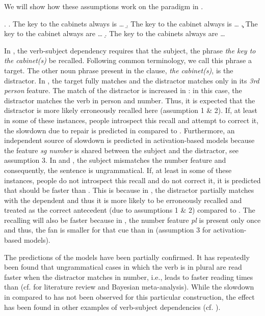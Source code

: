 \documentclass[11pt]{article} %
\begin{document}
\noindent We will show how these assumptions work on the paradigm in \Next.

\ex.
\a. The key to the cabinets always is \ldots
\b. The key to the cabinet always is \ldots
\c. The key to the cabinet always are \ldots
\d. The key to the cabinets always are \ldots

In \Last, the verb-subject dependency requires that the subject, the phrase \textit{the key to the cabinet(s)} be recalled. Following common terminology, we call this phrase a target. The other noun phrase present in the clause, \textit{the cabinet(s)}, is the distractor. In \Last[a], the target fully matches and the distractor matches only in its \emph{3rd person} feature. The match of the distractor is increased in \Last[b]: in this case, the distractor matches the verb in person and number. Thus, it is expected that the distractor is more likely erroneously recalled here (assumption 1 \& 2). If, at least in some of these instances, people introspect this recall and attempt to correct it, the slowdown due to repair is predicted in \Last[b] compared to \Last[a]. Furthermore, an independent source of slowdown is predicted in activation-based models because the feature \emph{sg number} is shared between the subject and the distractor, see assumption 3. In \Last[c] and \Last[d], the subject mismatches the number feature and consequently, the sentence is ungrammatical. If, at least in some of these instances, people do not introspect this recall and do not correct it, it is predicted that \Last[d] should be faster than \Last[c]. This is because in \Last[d], the distractor partially matches with the dependent and thus it is more likely to be erroneously recalled and treated as the correct antecedent (due to assumptions 1 \& 2) compared to \Last[c]. The recalling will also be faster because in \Last[d], the number feature \textit{pl} is present only once and thus, the fan is smaller for that cue than in \Last[c] (assumption 3 for activation-based models).

The predictions of the models have been partially confirmed. It has repeatedly been found that ungrammatical cases in which the verb is in plural are read faster when the distractor matches in number, i.e., \Last[d] leads to faster reading times than \Last[c] (cf. \citealt{jager+17} for literature review and Bayesian meta-analysis). While the slowdown in \Last[b] compared to \Last[a] has not been observed for this particular construction, the effect has been found in other examples of verb-subject dependencies (cf. \citealt{jager+17}).
\end{document}
